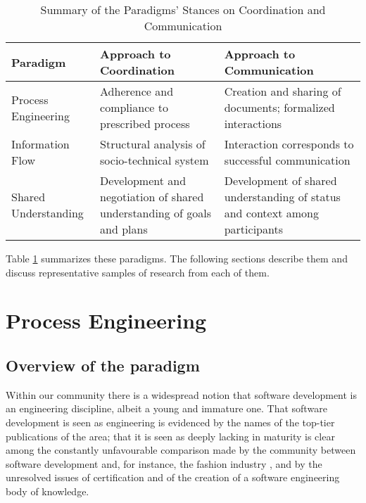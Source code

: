 \begin{table}[tpb]
\caption{\label{ParadigmSummaryTable} Summary of the Paradigms' Stances on Coordination and Communication}
\centering
\footnotesize{\begin{tabular}{p{3.4cm}p{5.1cm}p{5.1cm}}
\hline \hline
\vspace{1pt} \bfseries Paradigm & \vspace{1pt} \bfseries Approach to Coordination & \vspace{1pt} \bfseries Approach to Communication \\
\hline
\vspace{0.5pt} Process Engineering & \vspace{0.5pt} Adherence and compliance to prescribed process & \vspace{0.5pt} Creation and sharing of documents; formalized interactions \\
\hline
\vspace{0.5pt} Information Flow & \vspace{0.5pt} Structural analysis of socio-technical system & \vspace{0.5pt} Interaction corresponds to successful communication \\
\hline
\vspace{0.5pt} Shared Understanding & \vspace{0.5pt} Development and negotiation of shared understanding of goals and plans & \vspace{0.5pt} Development of shared understanding of status and context among participants \\
\hline
\end{tabular}}
\end{table}

Table \ref{ParadigmSummaryTable} summarizes these paradigms. The following sections describe them and discuss representative samples of research from each of them.



\section{Process Engineering}
\label{sec:ProcessEngineering}

\subsection{Overview of the paradigm}

Within our community there is a widespread notion that software development is an engineering discipline, albeit a young and immature one. That software development is seen as engineering is evidenced by the names of the top-tier publications of the area; that it is seen as deeply lacking in maturity is clear among the constantly unfavourable comparison made by the community between software development and, for instance, the fashion industry \cite{Jacobson2009}, and by the unresolved issues of certification and of the creation of a software engineering body of knowledge.


